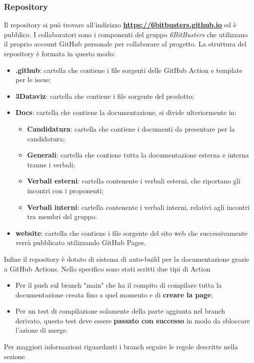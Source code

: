         \subsubsection{Repository}
        Il repository si può trovare all'indirizzo \textbf{\url{https://6bitbusters.github.io}} ed è pubblico.
        I collaboratori sono i componenti del gruppo \textit{6BitBusters} che utilizzano il proprio account GitHub
        personale per collaborare al progetto.
        La struttura del repository è formata in questo modo:
            \begin{itemize}
                \item \textbf{ .github}: cartella che contiene i file sorgenti delle GitHub Action e template per le issue;
                \item \textbf{3Dataviz}: cartella che contiene i file sorgente del prodotto;
                \item \textbf{Docs}: cartella che contiene la documentazione, si divide ulteriormente in:
                    \begin{itemize}
                        \item \textbf{Candidatura}: cartella che contiene i documenti da presentare per la candidatura;
                        \item \textbf{Generali}: cartella che contiene tutta la documentazione esterna e interna tranne i verbali;
                        \item \textbf{Verbali esterni}: cartella contenente i verbali esterni, che riportano gli incontri con i proponenti;
                        \item \textbf{Verbali interni}: cartella contenente i verbali interni, relativi agli incontri tra membri del gruppo.
                    \end{itemize}
                \item \textbf{website}: cartella che contiene i file sorgente del sito web che successivamente verrà pubblicato utilizzando GitHub Pages.
            \end{itemize}
        Infine il repository è dotato di sistema di auto-build per la documentazione grazie a GitHub Actions. Nello specifico sono stati scritti due tipi di Action
        \begin{itemize}
            \item Per il push sul branch "main" che ha il compito di compilare tutta la documentazione creata fino a quel momento e di \textbf{creare la page};
            \item Per un test di compilazione solamente della parte aggiunta nel branch derivato, questo test deve essere \textbf{passato con successo} in modo da sbloccare l'azione di merge.
        \end{itemize}
        Per maggiori informazioni riguardanti i branch seguire le regole descritte nella sezione 

